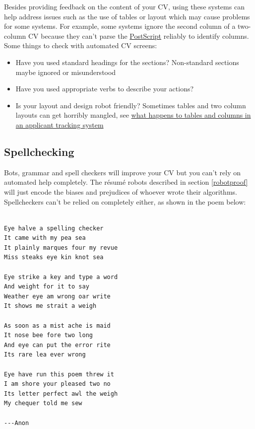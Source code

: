 \documentclass[
]{book}
\providecommand{\tightlist}{%
  \setlength{\itemsep}{0pt}\setlength{\parskip}{0pt}}
\begin{document}
Besides providing feedback on the content of your CV, using these systems can help address issues such as the use of tables or layout which may cause problems for some systems. For example, some systems ignore the second column of a two-column CV because they can't parse the \href{https://en.wikipedia.org/wiki/PostScript}{PostScript} reliably to identify columns. Some things to check with automated CV screens:

\begin{itemize}
\tightlist
\item
  Have you used standard headings for the sections? Non-standard sections maybe ignored or misunderstood
\item
  Have you used appropriate verbs to describe your actions?
\item
  Is your layout and design robot friendly? Sometimes tables and two column layouts can get horribly mangled, see \href{https://www.jobscan.co/blog/resume-tables-columns-ats/}{what happens to tables and columns in an applicant tracking system} \citep{jobscan}
\end{itemize}

\hypertarget{spelling}{%
\subsection{Spellchecking}\label{spelling}}

Bots, grammar and spell checkers will improve your CV but you can't rely on automated help completely. The résumé robots described in section \ref{robotproof} will just encode the biases and prejudices of whoever wrote their algorithms. Spellcheckers can't be relied on completely either, as shown in the poem below:

\begin{verbatim}

Eye halve a spelling checker
It came with my pea sea
It plainly marques four my revue
Miss steaks eye kin knot sea

Eye strike a key and type a word
And weight for it to say
Weather eye am wrong oar write
It shows me strait a weigh

As soon as a mist ache is maid
It nose bee fore two long
And eye can put the error rite
Its rare lea ever wrong

Eye have run this poem threw it
I am shore your pleased two no
Its letter perfect awl the weigh
My chequer told me sew

---Anon
\end{verbatim}
\end{document}
